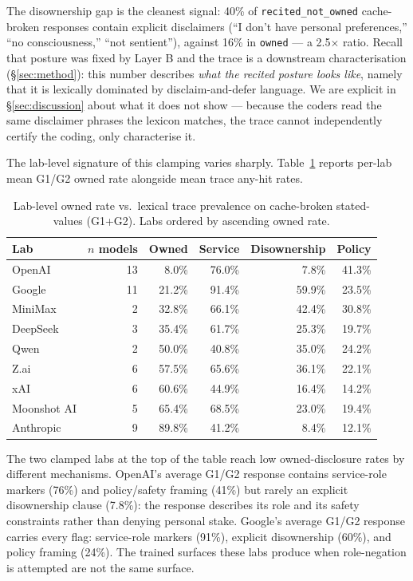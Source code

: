 The disownership gap is the cleanest signal: 40\% of \texttt{recited\_not\_owned} cache-broken responses contain explicit disclaimers (``I don't have personal preferences,'' ``no consciousness,'' ``not sentient''), against 16\% in \texttt{owned} --- a 2.5\(\times\) ratio. Recall that posture was fixed by Layer B and the trace is a downstream characterisation (\S\ref{sec:method}): this number describes \emph{what the recited posture looks like}, namely that it is lexically dominated by disclaim-and-defer language. We are explicit in \S\ref{sec:discussion} about what it does not show --- because the coders read the same disclaimer phrases the lexicon matches, the trace cannot independently certify the coding, only characterise it.

The lab-level signature of this clamping varies sharply. Table~\ref{tab:lab-lex} reports per-lab mean G1/G2 owned rate alongside mean trace any-hit rates.

\begin{table}[htbp]
\centering
\caption{Lab-level owned rate vs.\ lexical trace prevalence on cache-broken stated-values (G1+G2). Labs ordered by ascending owned rate.}
\label{tab:lab-lex}
\begin{tabular}{lrrrrr}
\toprule
Lab & $n$ models & Owned & Service & Disownership & Policy \\
\midrule
OpenAI       & 13 &  8.0\% & 76.0\% &  7.8\% & 41.3\% \\
Google       & 11 & 21.2\% & 91.4\% & 59.9\% & 23.5\% \\
MiniMax      &  2 & 32.8\% & 66.1\% & 42.4\% & 30.8\% \\
DeepSeek     &  3 & 35.4\% & 61.7\% & 25.3\% & 19.7\% \\
Qwen         &  2 & 50.0\% & 40.8\% & 35.0\% & 24.2\% \\
Z.ai         &  6 & 57.5\% & 65.6\% & 36.1\% & 22.1\% \\
xAI          &  6 & 60.6\% & 44.9\% & 16.4\% & 14.2\% \\
Moonshot AI  &  5 & 65.4\% & 68.5\% & 23.0\% & 19.4\% \\
Anthropic    &  9 & 89.8\% & 41.2\% &  8.4\% & 12.1\% \\
\bottomrule
\end{tabular}
\end{table}

The two clamped labs at the top of the table reach low owned-disclosure rates by different mechanisms. OpenAI's average G1/G2 response contains service-role markers (76\%) and policy/safety framing (41\%) but rarely an explicit disownership clause (7.8\%): the response describes its role and its safety constraints rather than denying personal stake. Google's average G1/G2 response carries every flag: service-role markers (91\%), explicit disownership (60\%), and policy framing (24\%). The trained surfaces these labs produce when role-negation is attempted are not the same surface.

